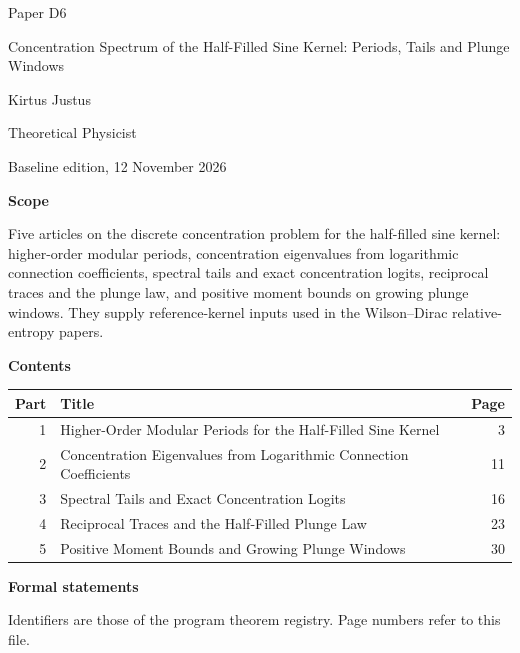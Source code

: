 \documentclass[11pt,a4paper]{article}
\begin{document}
\thispagestyle{empty}\pagestyle{empty}
{\small\sffamily \ProgramTitle\hfill Paper D6\par}
\vspace*{12mm}
{\LARGE\bfseries\raggedright{} Concentration Spectrum of the Half-Filled Sine Kernel: Periods, Tails and Plunge Windows\par}
\vspace{9mm}
{\large Kirtus Justus\par}\vspace{1mm}Theoretical Physicist\par\AuthorLocation\par\vspace{2mm}Baseline edition, 12 November 2026\par\vspace{8mm}
\textbf{Scope}\par
Five articles on the discrete concentration problem for the half-filled sine kernel: higher-order modular periods, concentration eigenvalues from logarithmic connection coefficients, spectral tails and exact concentration logits, reciprocal traces and the plunge law, and positive moment bounds on growing plunge windows. They supply reference-kernel inputs used in the Wilson–Dirac relative-entropy papers.\par\vspace{5mm}
\textbf{Contents}\par\vspace{1mm}
{\small\begin{longtable}{@{}r>{\raggedright\arraybackslash}p{}r@{}}
\toprule Part & Title & Page\\\midrule\endhead
1 & Higher-Order Modular Periods for the Half-Filled Sine Kernel & 3\\
2 & Concentration Eigenvalues from Logarithmic Connection Coefficients & 11\\
3 & Spectral Tails and Exact Concentration Logits & 16\\
4 & Reciprocal Traces and the Half-Filled Plunge Law & 23\\
5 & Positive Moment Bounds and Growing Plunge Windows & 30\\
\bottomrule\end{longtable}}
\vspace{2mm}\textbf{Formal statements}\par\vspace{1mm}
{\footnotesize Identifiers are those of the program theorem registry. Page numbers refer to this file.\par}
\end{document}
